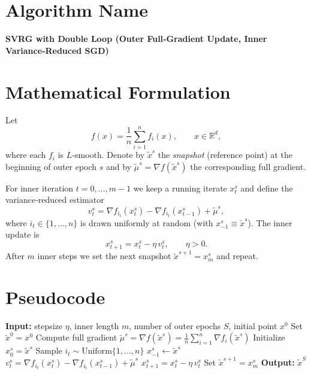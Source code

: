 \documentclass[11pt]{article}
\newcommand{\grad}{\nabla}
\begin{document}
\section*{Algorithm Name}
\textbf{SVRG with Double Loop (Outer Full‑Gradient Update, Inner Variance‑Reduced SGD)}  

\section*{Mathematical Formulation}
Let 
\[
f(x)=\frac{1}{n}\sum_{i=1}^{n}f_i(x),\qquad 
x\in\mathbb{R}^{d},
\]
where each $f_i$ is $L$‑smooth.  
Denote by $\tilde{x}^{s}$ the \emph{snapshot} (reference point) at the beginning of outer epoch $s$ and by $\tilde{\mu}^{s}= \grad f(\tilde{x}^{s})$ the corresponding full gradient.  

For inner iteration $t=0,\dots,m-1$ we keep a running iterate $x_{t}^{s}$ and define the variance‑reduced estimator
\[
v_{t}^{s}= \grad f_{i_t}(x_{t}^{s})-\grad f_{i_t}(x_{t-1}^{s})+\tilde{\mu}^{s},
\tag{1}
\]
where $i_t\in\{1,\dots ,n\}$ is drawn uniformly at random (with $x_{-1}^{s}\equiv \tilde{x}^{s}$).  
The inner update is
\[
x_{t+1}^{s}=x_{t}^{s}-\eta\, v_{t}^{s},
\qquad \eta>0.
\tag{2}
\]
After $m$ inner steps we set the next snapshot $\tilde{x}^{s+1}=x_{m}^{s}$ and repeat.

\section*{Pseudocode}
\begin{algorithm}[H]
\caption{Double‑Loop SVRG}
\begin{algorithmic}[1]
\STATE \textbf{Input:} stepsize $\eta$, inner length $m$, number of outer epochs $S$, initial point $x^{0}$
\STATE Set $\tilde{x}^{0}=x^{0}$
    \STATE Compute full gradient $\tilde{\mu}^{s}= \grad f(\tilde{x}^{s})=\frac1n\sum_{i=1}^{n}\grad f_i(\tilde{x}^{s})$
    \STATE Initialize $x_{0}^{s}= \tilde{x}^{s}$
        \STATE Sample $i_t\!\sim\! \text{Uniform}\{1,\dots,n\}$
            \STATE $x_{-1}^{s}\gets \tilde{x}^{s}$ 
        \ENDIF
        \STATE $v_{t}^{s}= \grad f_{i_t}(x_{t}^{s})-\grad f_{i_t}(x_{t-1}^{s})+\tilde{\mu}^{s}$
        \STATE $x_{t+1}^{s}= x_{t}^{s}-\eta\, v_{t}^{s}$
    \ENDFOR
    \STATE Set $\tilde{x}^{s+1}=x_{m}^{s}$
\ENDFOR
\STATE \textbf{Output:} $\tilde{x}^{S}$
\end{algorithmic}
\end{algorithm}
\end{document}
